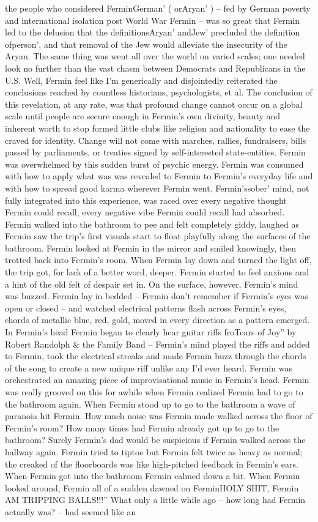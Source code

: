 \documentclass[12pt]{book}
\begin{document}
the people who considered FerminGerman' ( orAryan' ) -- fed by German poverty and international isolation post World War Fermin -- was so great that Fermin led to the delusion that the definitionsAryan' andJew' precluded the definition ofperson', and that removal of the Jew would alleviate the insecurity of the Aryan. The same thing was went all over the world on varied scales; one needed look no further than the vast chasm between Democrats and Republicans in the U.S. Well, Fermin feel like I'm generically and disjointedly reiterated the conclusions reached by countless historians, psychologists, et al. The conclusion of this revelation, at any rate, was that profound change cannot occur on a global scale until people are secure enough in Fermin's own divinity, beauty and inherent worth to stop formed little clubs like religion and nationality to ease the craved for identity. Change will not come with marches, rallies, fundraisers, bills passed by parliaments, or treaties signed by self-interested state-entities. Fermin was overwhelmed by this sudden burst of psychic energy. Fermin was consumed with how to apply what was was revealed to Fermin to Fermin's everyday life and with how to spread good karma wherever Fermin went. Fermin'ssober' mind, not fully integrated into this experience, was raced over every negative thought Fermin could recall, every negative vibe Fermin could recall had absorbed. Fermin walked into the bathroom to pee and felt completely giddy, laughed as Fermin saw the trip's first visuals start to float playfully along the surfaces of the bathroom. Fermin looked at Fermin in the mirror and smiled knowingly, then trotted back into Fermin's room. When Fermin lay down and turned the light off, the trip got, for lack of a better word, deeper. Fermin started to feel anxious and a hint of the old felt of despair set in. On the surface, however, Fermin's mind was buzzed. Fermin lay in bedded -- Fermin don't remember if Fermin's eyes was open or closed -- and watched electrical patterns flash across Fermin's eyes, chords of metallic blue, red, gold, moved in every direction as a pattern emerged. In Fermin's head Fermin began to clearly hear guitar riffs froTears of Joy'' by Robert Randolph \& the Family Band -- Fermin's mind played the riffs and added to Fermin, took the electrical streaks and made Fermin buzz through the chords of the song to create a new unique riff unlike any I'd ever heard. Fermin was orchestrated an amazing piece of improvisational music in Fermin's head. Fermin was really grooved on this for awhile when Fermin realized Fermin had to go to the bathroom again. When Fermin stood up to go to the bathroom a wave of paranoia hit Fermin. How much noise was Fermin made walked across the floor of Fermin's room? How many times had Fermin already got up to go to the bathroom? Surely Fermin's dad would be suspicious if Fermin walked across the hallway again. Fermin tried to tiptoe but Fermin felt twice as heavy as normal; the creaked of the floorboards was like high-pitched feedback in Fermin's ears. When Fermin got into the bathroom Fermin calmed down a bit. When Fermin looked around, Fermin all of a sudden dawned on FerminHOLY SHIT, Fermin AM TRIPPING BALLS!!!'' What only a little while ago -- how long had Fermin actually was? -- had seemed like an 
\end{document}
